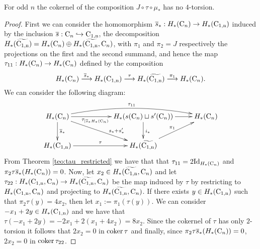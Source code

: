\begin{lem} \label{lem:comp_no_4}
For odd $n$ the cokernel of the composition $J \circ \tau \circ \mu_*$ has no $4$-torsion.
\end{lem}
\begin{proof}
First we can consider the homomorphism $\overline{s}_*:H_*(\operatorname{C}_n) \to H_*(\operatorname{C_{1,n}})$ induced by the inclusion $\overline{s}:\operatorname{C}_n \hookrightarrow \operatorname{C_{1,n}}$, the decomposition $H_*(\widetilde{\operatorname{C_{1,n}}}) = H_*(\operatorname{C}_n) \oplus H_*(\widetilde{\operatorname{C_{1,n}}}, \operatorname{C}_n)$, with $\pi_1$ and $\pi_2= J$ respectively the projections on the first and the second summand,  and hence the map  $\tau_{11}:H_*(\operatorname{C}_n) \to H_*(\operatorname{C}_n)$ defined by the composition
$$
H_*(\operatorname{C}_n) \stackrel{\overline{s}_*}{\longrightarrow} H_*(\operatorname{C_{1,n}}) \stackrel{\tau}{\longrightarrow} H_*(\widetilde{\operatorname{C_{1,n}}}) \stackrel{\pi_1}{\longrightarrow} H_*(\operatorname{C}_n).
$$
We can consider the following diagram:
$$
\xymatrix{ H_*(\conf_n) \ar[d]^{\overline{s}_*} \ar[drr]^(0.65){s_*+s'_*} \ar[rr]_(0.44){\tau_{|\overline{s}_*H_*(\conf_n)}} \ar@/^1pc/[rrr]^{\tau_{11}}
	&& H_*(s(\conf_{n})  \sqcup s'(\conf_{n}))\ar[d]^{i_*} \ar[r] & H_*(\conf_n) \\ H_*(\confm{n}) \ar[rr]^\tau && H_*(\confmd{n}) \ar[ur]^{\pi_1}  }
$$
From Theorem \ref{teo:tau_restricted} we have that that $\tau_{11} = 2 \mathrm{Id}_{H_*(\operatorname{C}_n)}$ and
$\pi_2 \tau\overline{s}_*(H_*(\operatorname{C}_n))=0$. %
Now, let $x_2 \in H_*(\widetilde{\operatorname{C_{1,n}}}, \operatorname{C}_n)$ and let $\tau_{22}: H_*(\operatorname{C_{1,n}}, \operatorname{C}_n) \to H_*(\widetilde{\operatorname{C_{1,n}}}, \operatorname{C}_n)$ be the map induced by $\tau$ by restricting to $H_*(\operatorname{C_{1,n}}, \operatorname{C}_n)$ and projecting to $H_*(\widetilde{\operatorname{C_{1,n}}}, \operatorname{C}_n)$. If there exists $y \in H_*(\operatorname{C_{1,n}})$ such that $\pi_2 \tau (y) = 4 x_2$, then let $x_1:= \pi_1(\tau(y))$. We can consider $-x_1 + 2 y \in H_*(\operatorname{C_{1,n}})$ and we have that $\tau(-x_1 + 2 y) = -2 x_1 + 2 (x_1 +4x_2) = 8 x_2$. Since the cokernel of $\tau$ has only $2$-torsion it follows that $2x_2 = 0$ in $\operatorname{\mathrm{coker}} \tau$ and finally, since $\pi_2 \tau \overline{s}_*(H_*(\operatorname{C}_n))= 0$, $2x_2 = 0$ in $\operatorname{\mathrm{coker}} \tau_{22}$.
\end{proof}



